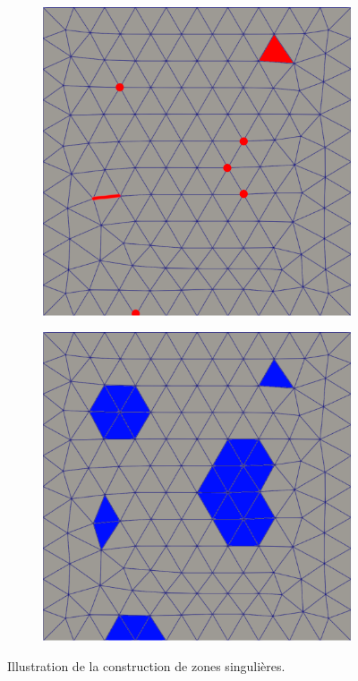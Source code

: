 \begin{figure}[h!]
\centering
\begin{subfigure}{0.49\textwidth}
    \includegraphics[width=\textwidth]{images/zone_singuliere_1.pdf}
\end{subfigure}
\hfill
\begin{subfigure}{0.49\textwidth}
    \includegraphics[width=\textwidth]{images/zone_singuliere_2.pdf}
\end{subfigure}
\caption{Illustration de la construction de zones singulières.}
\label{fig:zone_singuliere}
\end{figure}


